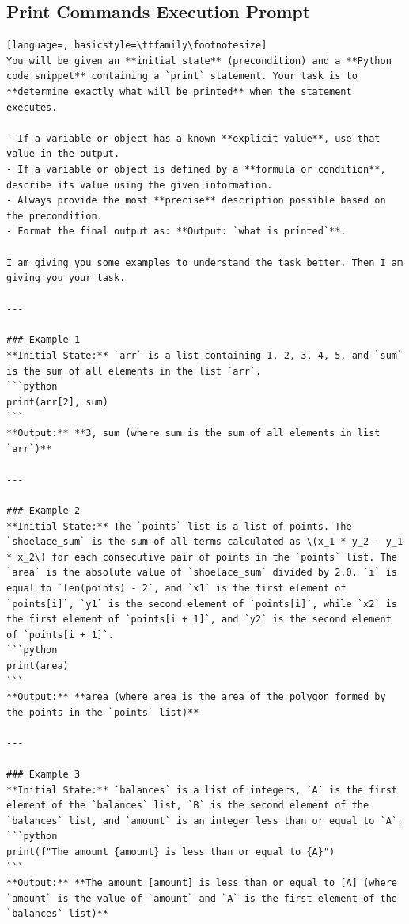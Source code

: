 \documentclass[sigconf]{acmart}
\begin{document}
\subsection{Print Commands Execution Prompt}
\label{print_prompt}
\begin{tcolorbox}[ colback=gray!10, colframe=black, arc=5pt]
\begin{lstlisting}[language=, basicstyle=\ttfamily\footnotesize]
You will be given an **initial state** (precondition) and a **Python code snippet** containing a `print` statement. Your task is to **determine exactly what will be printed** when the statement executes.

- If a variable or object has a known **explicit value**, use that value in the output.  
- If a variable or object is defined by a **formula or condition**, describe its value using the given information.  
- Always provide the most **precise** description possible based on the precondition.
- Format the final output as: **Output: `what is printed`**.

I am giving you some examples to understand the task better. Then I am giving you your task.

---

### Example 1  
**Initial State:** `arr` is a list containing 1, 2, 3, 4, 5, and `sum` is the sum of all elements in the list `arr`.  
```python
print(arr[2], sum)
```
**Output:** **3, sum (where sum is the sum of all elements in list `arr`)**

---

### Example 2  
**Initial State:** The `points` list is a list of points. The `shoelace_sum` is the sum of all terms calculated as \(x_1 * y_2 - y_1 * x_2\) for each consecutive pair of points in the `points` list. The `area` is the absolute value of `shoelace_sum` divided by 2.0. `i` is equal to `len(points) - 2`, and `x1` is the first element of `points[i]`, `y1` is the second element of `points[i]`, while `x2` is the first element of `points[i + 1]`, and `y2` is the second element of `points[i + 1]`.
```python
print(area)
```
**Output:** **area (where area is the area of the polygon formed by the points in the `points` list)**

---

### Example 3  
**Initial State:** `balances` is a list of integers, `A` is the first element of the `balances` list, `B` is the second element of the `balances` list, and `amount` is an integer less than or equal to `A`.
```python
print(f"The amount {amount} is less than or equal to {A}")
```
**Output:** **The amount [amount] is less than or equal to [A] (where `amount` is the value of `amount` and `A` is the first element of the `balances` list)**


\end{lstlisting}
\end{tcolorbox}
\end{document}
